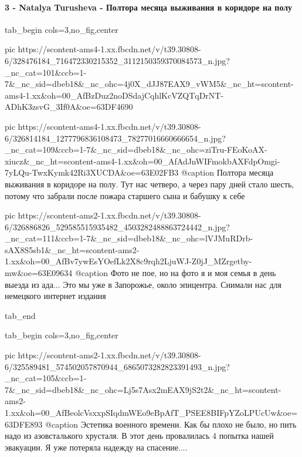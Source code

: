  
 
 
 
 

\clearpage
\paragraph{3 - Natalya Turusheva - Полтора месяца выживания в коридоре на полу}

\par


\ifcmt
  tab_begin cols=3,no_fig,center

     pic https://scontent-ams4-1.xx.fbcdn.net/v/t39.30808-6/328476184_716472330215352_3112150359370084573_n.jpg?_nc_cat=101&ccb=1-7&_nc_sid=dbeb18&_nc_ohc=4j0X_dJJ87EAX9_vWM5&_nc_ht=scontent-ams4-1.xx&oh=00_AfBzDuz2noDSdajCqhlKcVZQTqDrNT-ADhK3zsvG_3If0A&oe=63DF4690

     pic https://scontent-ams4-1.xx.fbcdn.net/v/t39.30808-6/326814184_1277796836108473_78277016660666654_n.jpg?_nc_cat=109&ccb=1-7&_nc_sid=dbeb18&_nc_ohc=ziTru-FEoKoAX-xiucz&_nc_ht=scontent-ams4-1.xx&oh=00_AfAdJnWIFmokbAXFdpOmgi-7yLQu-TwxKymk42Ri3XUCDA&oe=63E02FB3
     @caption Полтора месяца выживания в коридоре на полу. Тут нас четверо, а через пару дней стало шесть, потому что забрали после пожара старшего сына и бабушку к себе

     pic https://scontent-ams2-1.xx.fbcdn.net/v/t39.30808-6/326886826_529585515935482_4503282488863724442_n.jpg?_nc_cat=111&ccb=1-7&_nc_sid=dbeb18&_nc_ohc=lVJMuRDrb-sAX8S5sb1&_nc_ht=scontent-ams2-1.xx&oh=00_AfBv7ywEsYOefLk2X8c9rqh2LjuWJ-Z0jJ_MZrgetby-mw&oe=63E09634
     @caption Фото не пое, но на фото я и моя семья в день выезда из ада... Это мы уже в Запорожье, около эпицентра. Снимали нас для немецкого интернет издания

  tab_end
\fi


\ifcmt
  tab_begin cols=3,no_fig,center

     pic https://scontent-ams2-1.xx.fbcdn.net/v/t39.30808-6/325589481_574502057870944_6865073282823391493_n.jpg?_nc_cat=105&ccb=1-7&_nc_sid=dbeb18&_nc_ohc=Lj5s7Asx2mEAX9jS2t2&_nc_ht=scontent-ams2-1.xx&oh=00_AfBeolcVsxxpSIqdmWEo9eBpAfT_PSEE8BIFpYZoLPUcUw&oe=63DFE893
     @caption Эстетика военного времени. Как бы плохо не было, но пить надо из азовсталького хрусталя. В этот день провалилась 4 попытка нашей эвакуации. Я уже потеряла надежду на спасение....

